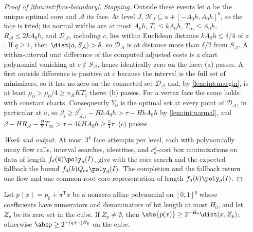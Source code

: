 \begin{proof}[Proof of \cref{thm:int:flow-boundary}]
\emph{Stopping.} Outside these events let $a$ be the unique optimal core and
$\mathcal A$ its face. At level $J$, $\mathcal H_J\subseteq a+[-A_0h,A_0h]^k$, so the face
is tried; its normal widths are at most $A_0h$, $T_1\le kA_0h$, $T_\infty\le A_0h$,
$R_{\mathcal A}\le2kA_0h$, and $\mathcal D_{\mathcal A}$, including $c$, lies within
Euclidean distance $kA_0h\le\delta/4$ of $a$. If $q\ge1$, then $\dist(a,S_{\mathcal A})>\delta$,
so $\mathcal D_{\mathcal A}$ is at distance more than $\delta/2$ from $S_{\mathcal A}$. A
within-interval unit difference of the computed adjusted costs is a chart polynomial
vanishing at $c\notin S_{\mathcal A}$, hence identically zero on the face: (a) passes.
A first outside difference is positive at $c$ because the interval is the full set of
minimizers, so it has no zero on the connected set $\mathcal D_{\mathcal A}$ and, by
\cref{lem:int:margin}, is at least $\mu_0>\mu_0/4\ge n_RKT_1$ there: (b) passes. For a
vertex face the same holds with constant charts. Consequently $Y_0$ is the optimal set
at every point of $\mathcal D_{\mathcal A}$, in particular at $a$, so
$\beta_i\ge\beta^*_{\mathcal A,i}-HkA_0h>\tau-HkA_0h$ by \cref{lem:int:normal}, and
$\beta-HR_{\mathcal A}-\frac H2T_\infty>\tau-4kHA_0h\ge\frac34\tau$: (c) passes.

\emph{Work and output.} At most $3^k$ face attempts per level, each with polynomially
many flow calls, interval searches, identities, and $c_d^k$-cost box minimizations on
data of length $f_d(k)\poly_d(I)$, give with the core search and the expected fallback
the bound $f_d(k)Q_{\rm ex}\poly_d(I)$. The completion and the fallback return one flow
and one common-root core representation of length $f_d(k)\poly_d(I)$.
\end{proof}

\begin{lemma}\label{lem:int:affine-margin}
Let $p(x)=p_0+\pi^{\mathsf T}x$ be a nonzero affine polynomial on $[0,1]^q$ whose
coefficients have numerators and denominators of bit length at most $H_0$, and let
$Z_p$ be its zero set in the cube. If $Z_p\ne\emptyset$, then
$\abs{p(x)}\ge2^{-H_0}\dist(x,Z_p)$; otherwise $\abs p\ge2^{-(q+1)H_0}$ on the cube.
\end{lemma}

